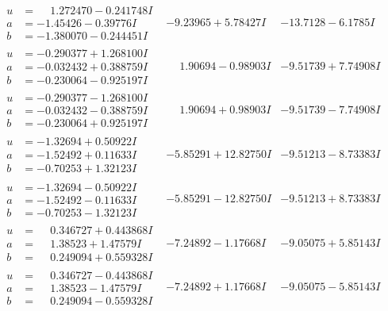 \documentclass[1p]{elsarticle_modified}
\theoremstyle{definition}
\begin{document}
$$\begin{array}{c|c|c}
\begin{aligned}
u &= \phantom{-}1.272470 - 0.241748 I \\
a &= -1.45426 - 0.39776 I \\
b &= -1.380070 - 0.244451 I\end{aligned}
 & -9.23965 + 5.78427 I & -13.7128 - 6.1785 I \\ \hline\begin{aligned}
u &= -0.290377 + 1.268100 I \\
a &= -0.032432 + 0.388759 I \\
b &= -0.230064 - 0.925197 I\end{aligned}
 & \phantom{-}1.90694 - 0.98903 I & -9.51739 + 7.74908 I \\ \hline\begin{aligned}
u &= -0.290377 - 1.268100 I \\
a &= -0.032432 - 0.388759 I \\
b &= -0.230064 + 0.925197 I\end{aligned}
 & \phantom{-}1.90694 + 0.98903 I & -9.51739 - 7.74908 I \\ \hline\begin{aligned}
u &= -1.32694 + 0.50922 I \\
a &= -1.52492 + 0.11633 I \\
b &= -0.70253 + 1.32123 I\end{aligned}
 & -5.85291 + 12.82750 I & -9.51213 - 8.73383 I \\ \hline\begin{aligned}
u &= -1.32694 - 0.50922 I \\
a &= -1.52492 - 0.11633 I \\
b &= -0.70253 - 1.32123 I\end{aligned}
 & -5.85291 - 12.82750 I & -9.51213 + 8.73383 I \\ \hline\begin{aligned}
u &= \phantom{-}0.346727 + 0.443868 I \\
a &= \phantom{-}1.38523 + 1.47579 I \\
b &= \phantom{-}0.249094 + 0.559328 I\end{aligned}
 & -7.24892 - 1.17668 I & -9.05075 + 5.85143 I \\ \hline\begin{aligned}
u &= \phantom{-}0.346727 - 0.443868 I \\
a &= \phantom{-}1.38523 - 1.47579 I \\
b &= \phantom{-}0.249094 - 0.559328 I\end{aligned}
 & -7.24892 + 1.17668 I & -9.05075 - 5.85143 I \\ \hline\begin{aligned}

\end{aligned}
\end{array}$$
\end{document}
